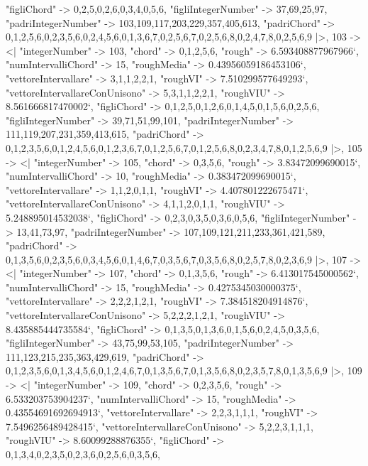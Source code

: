 \documentclass[
]{article}
\begin{document}
\begin{DatasetVerbatim}
    "figliChord" -> {{0,2,5},{0,2,6},{0,3,4},{0,5,6}},
    "figliIntegerNumber" -> {37,69,25,97},
    "padriIntegerNumber" -> {103,109,117,203,229,357,405,613},
    "padriChord" -> {{0,1,2,5,6},{0,2,3,5,6},{0,2,4,5,6},{0,1,3,6,7},{0,2,5,6,7},{0,2,5,6,8},{0,2,4,7,8},{0,2,5,6,9}}
  |>,
  103 -> <|
    "integerNumber" -> 103,
    "chord" -> {0,1,2,5,6},
    "rough" -> 6.593408877967966`,
    "numIntervalliChord" -> 15,
    "roughMedia" -> 0.43956059186453106`,
    "vettoreIntervallare" -> {3,1,1,2,2,1},
    "roughVI" -> 7.510299577649293`,
    "vettoreIntervallareConUnisono" -> {5,3,1,1,2,2,1},
    "roughVIU" -> 8.561666817470002`,
    "figliChord" -> {{0,1,2,5},{0,1,2,6},{0,1,4,5},{0,1,5,6},{0,2,5,6}},
    "figliIntegerNumber" -> {39,71,51,99,101},
    "padriIntegerNumber" -> {111,119,207,231,359,413,615},
    "padriChord" -> {{0,1,2,3,5,6},{0,1,2,4,5,6},{0,1,2,3,6,7},{0,1,2,5,6,7},{0,1,2,5,6,8},{0,2,3,4,7,8},{0,1,2,5,6,9}}
  |>,
  105 -> <|
    "integerNumber" -> 105,
    "chord" -> {0,3,5,6},
    "rough" -> 3.83472099690015`,
    "numIntervalliChord" -> 10,
    "roughMedia" -> 0.383472099690015`,
    "vettoreIntervallare" -> {1,1,2,0,1,1},
    "roughVI" -> 4.407801222675471`,
    "vettoreIntervallareConUnisono" -> {4,1,1,2,0,1,1},
    "roughVIU" -> 5.248895014532038`,
    "figliChord" -> {{0,2,3},{0,3,5},{0,3,6},{0,5,6}},
    "figliIntegerNumber" -> {13,41,73,97},
    "padriIntegerNumber" -> {107,109,121,211,233,361,421,589},
    "padriChord" -> {{0,1,3,5,6},{0,2,3,5,6},{0,3,4,5,6},{0,1,4,6,7},{0,3,5,6,7},{0,3,5,6,8},{0,2,5,7,8},{0,2,3,6,9}}
  |>,
  107 -> <|
    "integerNumber" -> 107,
    "chord" -> {0,1,3,5,6},
    "rough" -> 6.413017545000562`,
    "numIntervalliChord" -> 15,
    "roughMedia" -> 0.4275345030000375`,
    "vettoreIntervallare" -> {2,2,2,1,2,1},
    "roughVI" -> 7.384518204914876`,
    "vettoreIntervallareConUnisono" -> {5,2,2,2,1,2,1},
    "roughVIU" -> 8.435885444735584`,
    "figliChord" -> {{0,1,3,5},{0,1,3,6},{0,1,5,6},{0,2,4,5},{0,3,5,6}},
    "figliIntegerNumber" -> {43,75,99,53,105},
    "padriIntegerNumber" -> {111,123,215,235,363,429,619},
    "padriChord" -> {{0,1,2,3,5,6},{0,1,3,4,5,6},{0,1,2,4,6,7},{0,1,3,5,6,7},{0,1,3,5,6,8},{0,2,3,5,7,8},{0,1,3,5,6,9}}
  |>,
  109 -> <|
    "integerNumber" -> 109,
    "chord" -> {0,2,3,5,6},
    "rough" -> 6.533203753904237`,
    "numIntervalliChord" -> 15,
    "roughMedia" -> 0.43554691692694913`,
    "vettoreIntervallare" -> {2,2,3,1,1,1},
    "roughVI" -> 7.5496256489428415`,
    "vettoreIntervallareConUnisono" -> {5,2,2,3,1,1,1},
    "roughVIU" -> 8.60099288876355`,
    "figliChord" -> {{0,1,3,4},{0,2,3,5},{0,2,3,6},{0,2,5,6},{0,3,5,6}},

\end{DatasetVerbatim}
\end{document}
